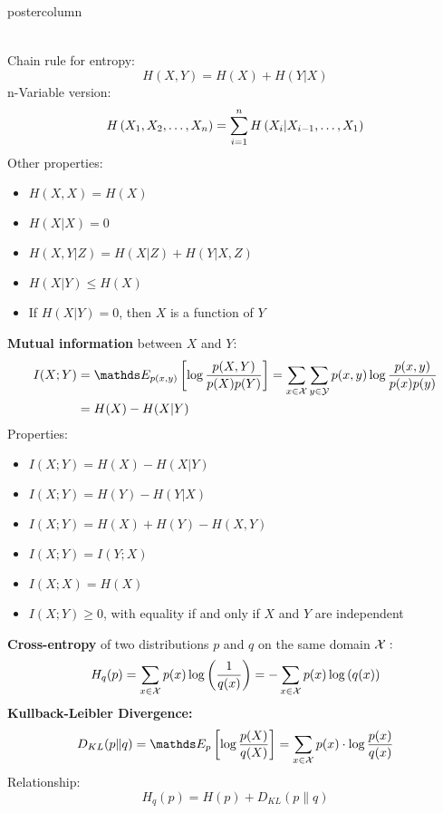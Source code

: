 \documentclass{beamer}
\begin{document}
\begin{frame}[fragile]{}
\begin{columns}
\begin{column}{.31\textwidth}
\begin{beamercolorbox}[center]{postercolumn}
\begin{minipage}{.98\textwidth}
{\begin{myblock}{}
\begin{small}
\begin{equation*}
\begin{aligned}
\end{aligned}\end{equation*}\end{small}  
%
Chain rule for entropy:
%
$$H(X, Y)=H(X)+H(Y | X)$$
%
n-Variable version:
$$H\left(X_{1}, X_{2}, \ldots, X_{n}\right)=\sum\limits_{i=1}^n H\left(X_{i} | X_{i-1}, \ldots, X_{1}\right)$$
%
Other properties:
%
\begin{itemize}
	\setlength{\itemindent}{+.3in}
		\item $H(X, X)       = H(X)  $
		\item $H(X | X)      = 0 $
		\item $H(X, Y | Z)   =H(X | Z)+H(Y | X, Z)$
		\item $H(X | Y) \leq H(X) $
		\item  If $H(X|Y) = 0$, then $X$ is a function of $Y$
\end{itemize}
%
\textbf{Mutual information} between $X$ and $Y:$
%
\begin{equation*}\begin{aligned}
		I(X ; Y) &= \E_{p(x, y)} \left[ \log \frac{p(X, Y)}{p(X) p(Y)} \right] = \sum_{x \in \Xspace} \sum_{y \in \Yspace} p(x, y) \log \frac{p(x, y)}{p(x) p(y)} \\
		&= H(X)-H(X | Y)
%		
\end{aligned}\end{equation*}
%
Properties:
\begin{itemize}
	\setlength{\itemindent}{+.3in}
		\item $ I(X ; Y) = H(X) - H(X | Y) $
			\item $I(X ; Y) = H(Y) - H(Y | X) $
			\item $I(X ; Y) = H(X) + H(Y) - H(X, Y)$
			\item $I(X ; Y) = I(Y ; X) $
			\item $I(X ; X) = H(X)$
			\item $ I(X;Y) \geq 0$, with equality if and only if $X$ and $Y$ are independent
\end{itemize}
%
\textbf{Cross-entropy} of two distributions $p$ and $q$ on the same domain $\mathcal{X}:$
%
$$ H_q(p) = \sum_{x \in \mathcal{X}} p(x) \log\left(\frac{1}{q(x)}\right) = - \sum_{x \in \mathcal{X}} p(x) \log\left(q(x)\right) $$
%
\textbf{Kullback-Leibler Divergence:}
%
$$ D_{KL}(p \| q) = \E_p \left[\log \frac{p(X)}{q(X)}\right] = \sum_{x \in \Xspace} p(x) \cdot \log \frac{p(x)}{q(x)} $$
%
Relationship:
$$
H_q(p) = H(p) + D_{KL}(p \| q)
$$
\end{myblock}



}
\end{minipage}
\end{beamercolorbox}
\end{column}
\end{columns}
\end{frame}
\end{document}
